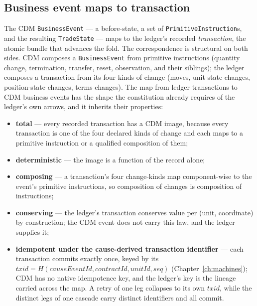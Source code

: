 \documentclass[11pt,a4paper]{article}
\begin{document}
\subsection{Business event maps to transaction}

The CDM \texttt{BusinessEvent} --- a before-state, a set of
\texttt{PrimitiveInstruction}s, and the resulting \texttt{TradeState} --- maps to
the ledger's recorded \emph{transaction}, the atomic bundle that advances the
fold. The correspondence is structural on both sides. CDM composes a
\texttt{BusinessEvent} from primitive instructions (quantity change,
termination, transfer, reset, observation, and their siblings); the ledger
composes a transaction from its four kinds of change (moves, unit-state changes,
position-state changes, terms changes). The map from ledger transactions to CDM
business events has the shape the constitution already requires of the ledger's
own arrows, and it inherits their properties:

\begin{itemize}[nosep,leftmargin=1.4em]
  \item \textbf{total} --- every recorded transaction has a CDM image, because
        every transaction is one of the four declared kinds of change and each
        maps to a primitive instruction or a qualified composition of them;
  \item \textbf{deterministic} --- the image is a function of the record alone;
  \item \textbf{composing} --- a transaction's four change-kinds map
        component-wise to the event's primitive instructions, so composition of
        changes is composition of instructions;
  \item \textbf{conserving} --- the ledger's transaction conserves value per
        (unit, coordinate) by construction; the CDM event does not carry this
        law, and the ledger supplies it;
  \item \textbf{idempotent under the cause-derived transaction identifier} --- each
        transaction commits exactly once, keyed by its
        $\mathit{txid}=H(\mathit{causeEventId},\mathit{contractId},\mathit{unitId},\mathit{seq})$
        (Chapter~\ref{ch:machines}); CDM has no native idempotence key, and the
        ledger's key is the lineage carried across the map. A retry of one leg
        collapses to its own $\mathit{txid}$, while the distinct legs of one cascade
        carry distinct identifiers and all commit.
\end{itemize}
\end{document}
